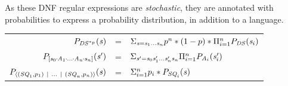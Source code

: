 \documentclass[acmsmall,screen,anonymous]{acmart}
\begin{document}
As these DNF regular expressions are \emph{stochastic}, they are annotated with
probabilities to express a probability distribution, in addition to a language.
\begin{center}
  \begin{tabular}{rcl}
    $P_{\mathit{DS}^{*_{p}}}(\mathit{s})$
    & =
    & $\Sigma_{\mathit{s} = \mathit{s}_1 \ldots \mathit{s}_n}p^n*(1-p)*\Pi_{i=1}^nP_{\mathit{DS}}(\mathit{s}_i)$\\
    
    $P_{[\mathit{s}_0 \mkern-1mu\cdot\mkern-1mu \mathit{A}_1 \mkern-1mu\cdot\mkern-1mu \ldots \mkern-1mu\cdot\mkern-1mu \mathit{A}_n \mkern-1mu\cdot\mkern-1mu \mathit{s}_n]}(\mathit{s}')$
    & =
    & $\Sigma_{\mathit{s}' = \mathit{s}_0\mathit{s}_1'\ldots\mathit{s}_n'\mathit{s}_n}\Pi_{i = 1}^nP_{\mathit{A}_i}(\mathit{s}_i')$ \\
    
    $P_{\langle(\mathit{SQ}_1,p_1) ~|~ \ldots ~|~ (\mathit{SQ}_n,p_n)\rangle}(\mathit{s})$
    & =
    & $\Sigma_{i=1}^np_i * P_{\mathit{SQ}_i}(\mathit{s})$\\
  \end{tabular}
\end{center}
\end{document}
